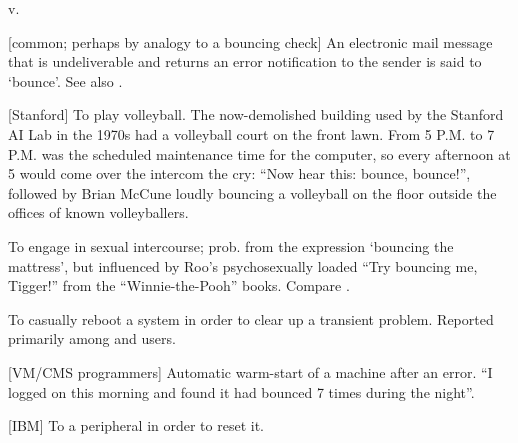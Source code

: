  v.

\begin{inparaenum}
\item {[}common; perhaps by analogy to a bouncing check] An electronic mail
    message that is undeliverable and returns an error notification to the
    sender is said to `bounce'. See also .
\item {[}Stanford] To play volleyball. The now-demolished  building used by the Stanford AI Lab in the 1970s had a volleyball
    court on the front lawn. From 5 P.M. to 7 P.M. was the scheduled maintenance
    time for the computer, so every afternoon at 5 would come over the intercom
    the cry: ``Now hear this: bounce, bounce!'', followed by Brian McCune loudly
    bouncing a volleyball on the floor outside the offices of known
    volleyballers.
\item To engage in sexual intercourse; prob. from the expression `bouncing the
    mattress', but influenced by Roo's psychosexually loaded ``Try bouncing me,
    Tigger!'' from the ``Winnie-the-Pooh'' books. Compare .
\item To casually reboot a system in order to clear up a transient problem.
    Reported primarily among  and  users.
\item {[}VM/CMS programmers] Automatic warm-start of a machine after an error.
    ``I logged on this morning and found it had bounced 7 times during the
    night''.
\item {[}IBM] To  a peripheral in order to reset it.
\end{inparaenum}

